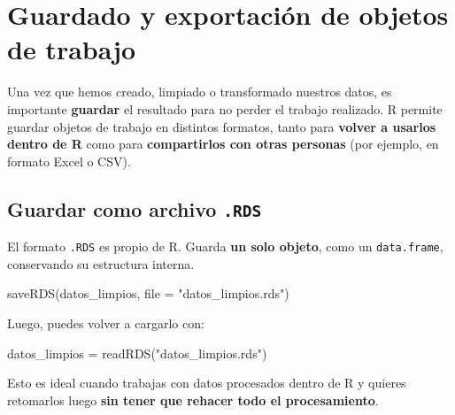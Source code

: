 \documentclass[
  letterpaper,
  DIV=11,
  numbers=noendperiod,
  twoside]{scrreprt}
\newenvironment{Shaded}{\begin{snugshade}}{\end{snugshade}}
\newcommand{\AttributeTok}[1]{\textcolor[rgb]{0.40,0.45,0.13}{#1}}
\newcommand{\FunctionTok}[1]{\textcolor[rgb]{0.28,0.35,0.67}{#1}}
\newcommand{\NormalTok}[1]{\textcolor[rgb]{0.00,0.23,0.31}{#1}}
\newcommand{\OtherTok}[1]{\textcolor[rgb]{0.00,0.23,0.31}{#1}}
\newcommand{\StringTok}[1]{\textcolor[rgb]{0.13,0.47,0.30}{#1}}
\begin{document}
\chapter{Guardado y exportación de objetos de
trabajo}\label{guardado-y-exportaciuxf3n-de-objetos-de-trabajo}

Una vez que hemos creado, limpiado o transformado nuestros datos, es
importante \textbf{guardar} el resultado para no perder el trabajo
realizado. R permite guardar objetos de trabajo en distintos formatos,
tanto para \textbf{volver a usarlos dentro de R} como para
\textbf{compartirlos con otras personas} (por ejemplo, en formato Excel
o CSV).

\section{\texorpdfstring{Guardar como archivo
\texttt{.RDS}}{Guardar como archivo .RDS}}\label{guardar-como-archivo-.rds}

El formato \texttt{.RDS} es propio de R. Guarda \textbf{un solo objeto},
como un \texttt{data.frame}, conservando su estructura interna.

\begin{Shaded}
\begin{Highlighting}[]
\FunctionTok{saveRDS}\NormalTok{(datos\_limpios, }\AttributeTok{file =} \StringTok{"datos\_limpios.rds"}\NormalTok{)}
\end{Highlighting}
\end{Shaded}

Luego, puedes volver a cargarlo con:

\begin{Shaded}
\begin{Highlighting}[]
\NormalTok{datos\_limpios }\OtherTok{=} \FunctionTok{readRDS}\NormalTok{(}\StringTok{"datos\_limpios.rds"}\NormalTok{)}
\end{Highlighting}
\end{Shaded}

\begin{tcolorbox}[enhanced jigsaw, titlerule=0mm, title=\textcolor{quarto-callout-note-color}{\faInfo}\hspace{0.5em}{Dato}, colback=white, opacityback=0, breakable, toprule=.15mm, left=2mm, leftrule=.75mm, colframe=quarto-callout-note-color-frame, bottomtitle=1mm, rightrule=.15mm, opacitybacktitle=0.6, coltitle=black, arc=.35mm, bottomrule=.15mm, toptitle=1mm, colbacktitle=quarto-callout-note-color!10!white]

Esto es ideal cuando trabajas con datos procesados dentro de R y quieres
retomarlos luego \textbf{sin tener que rehacer todo el procesamiento}.

\end{tcolorbox}
\end{document}
